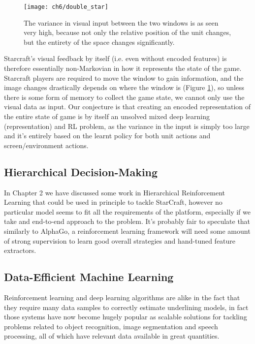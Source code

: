 \begin{figure}[h]
    \centering
    \texttt{[image: ch6/double\_star]}
    \caption{The variance in visual input between the two windows is as seen
      very high, because not only the relative position of the unit changes, but
      the entirety of the space changes significantly.}
    \label{fig:double_star}
\end{figure}

Starcraft’s visual feedback by itself (i.e. even without encoded features) is
therefore essentially non-Markovian in how it represents the state of the game.
Starcraft players are required to move the window to gain information, and the
image changes drastically depends on where the window is (Figure
\ref{fig:double_star}), so unless there is some form of memory to collect the
game state, we cannot only use the visual data as input. Our conjecture is that
creating an encoded representation of the entire state of game is by itself an
unsolved mixed deep learning (representation) and RL problem, as the variance in
the input is simply too large and it's entirely based on the learnt policy for
both unit actions and screen/environment actions.

\subsection{Hierarchical Decision-Making}

In Chapter 2 we have discussed some work in Hierarchical Reinforcement Learning
that could be used in principle to tackle StarCraft, however no particular model
seems to fit all the requirements of the platform, especially if we take and
end-to-end approach to the problem. It's probably fair to speculate that
similarly to AlphaGo, a reinforcement learning framework will need some amount
of strong supervision to learn good overall strategies and hand-tuned feature
extractors.


\subsection{Data-Efficient Machine Learning}

Reinforcement learning and deep learning algorithms are alike in the
fact that they require many data samples to correctly estimate underlining
models, in fact those systems have now become hugely popular as scalable
solutions for tackling problems related to object recognition, image
segmentation and speech processing, all of which have relevant data available in
great quantities.

